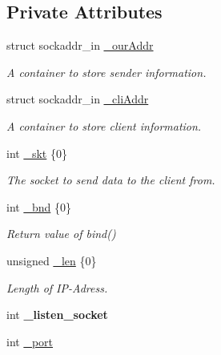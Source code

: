 \subsection*{Private Attributes}
\begin{DoxyCompactItemize}
\item 
struct sockaddr\+\_\+in \hyperlink{classconnector_1_1server_3_01TCP_01_4_aa75f95157f5a38c9ba65625b0ee7bddc}{\+\_\+our\+Addr}
\begin{DoxyCompactList}\small\item\em A container to store sender information. \end{DoxyCompactList}\item 
struct sockaddr\+\_\+in \hyperlink{classconnector_1_1server_3_01TCP_01_4_ad7dec6f05836574233c7db145fbd4efc}{\+\_\+cli\+Addr}
\begin{DoxyCompactList}\small\item\em A container to store client information. \end{DoxyCompactList}\item 
\mbox{\label{classconnector_1_1server_3_01TCP_01_4_aadd778d867c8a14a17fd68bad02e9835}} 
int \hyperlink{classconnector_1_1server_3_01TCP_01_4_aadd778d867c8a14a17fd68bad02e9835}{\+\_\+skt} \{0\}
\begin{DoxyCompactList}\small\item\em The socket to send data to the client from. \end{DoxyCompactList}\item 
\mbox{\label{classconnector_1_1server_3_01TCP_01_4_a95d55e03f6e459d70e44730ea4e41c39}} 
int \hyperlink{classconnector_1_1server_3_01TCP_01_4_a95d55e03f6e459d70e44730ea4e41c39}{\+\_\+bnd} \{0\}
\begin{DoxyCompactList}\small\item\em Return value of {\ttfamily bind()} \end{DoxyCompactList}\item 
\mbox{\label{classconnector_1_1server_3_01TCP_01_4_ad8bc67e50d0373e21ef8e863b3db1771}} 
unsigned \hyperlink{classconnector_1_1server_3_01TCP_01_4_ad8bc67e50d0373e21ef8e863b3db1771}{\+\_\+len} \{0\}
\begin{DoxyCompactList}\small\item\em Length of I\+P-\/\+Adress. \end{DoxyCompactList}\item 
\mbox{\label{classconnector_1_1server_3_01TCP_01_4_a6ca5938f795a6aa0c275abd8781a8b37}} 
int {\bfseries \+\_\+listen\+\_\+socket}
\item 
int \hyperlink{classconnector_1_1server_3_01TCP_01_4_a0131d121d7342e0020a6c8839f0ed510}{\+\_\+port}
\end{DoxyCompactItemize}


